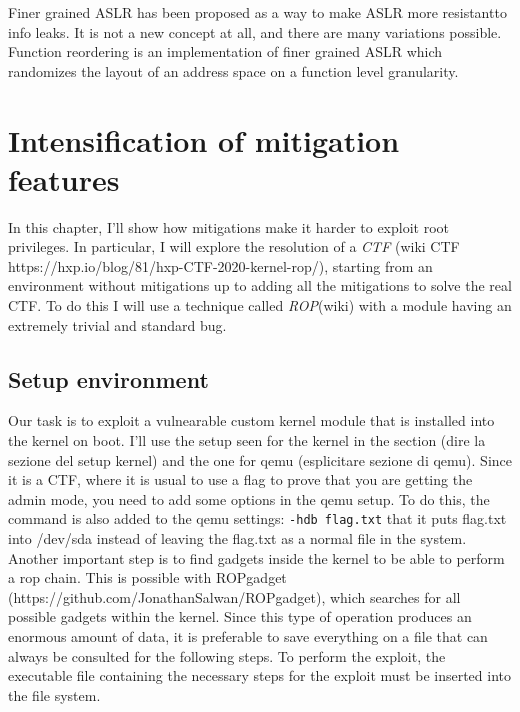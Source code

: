 \documentclass{masterthesis}
\begin{document}
Finer grained ASLR has been proposed as a way to make ASLR more resistantto info leaks. It is not a new concept at all, and there are many variations possible. Function reordering is an implementation of finer grained ASLR which randomizes the layout of an address space on a function level granularity.

\chapter{Intensification of mitigation features}
\label{ch:adding mitigation}
In this chapter, I'll show how mitigations make it harder to exploit root privileges.
In particular, I will explore the resolution of a \emph{CTF} (wiki CTF https://hxp.io/blog/81/hxp-CTF-2020-kernel-rop/), starting from an environment without mitigations up to adding all the mitigations to solve the real CTF.
To do this I will use a technique called \emph{ROP}(wiki) with a module having an extremely trivial and standard bug.
\section{Setup environment}
Our task is to exploit a vulnearable custom kernel module that is installed into the kernel on boot.
I'll use the setup seen for the kernel in the section (dire la sezione del setup kernel) and the one for qemu (esplicitare sezione di qemu).
Since it is a CTF, where it is usual to use a flag to prove that you are getting the admin mode, you need to add some options in the qemu setup.
To do this, the command is also added to the qemu settings:
\lstinline{-hdb flag.txt}
that it puts flag.txt into /dev/sda instead of leaving the flag.txt as a normal file in the system.
Another important step is to find gadgets inside the kernel to be able to perform a rop chain.
This is possible with ROPgadget (https://github.com/JonathanSalwan/ROPgadget), which searches for all possible gadgets within the kernel.
Since this type of operation produces an enormous amount of data, it is preferable to save everything on a file that can always be consulted for the following steps.
To perform the exploit, the executable file containing the necessary steps for the exploit must be inserted into the file system.
\end{document}
